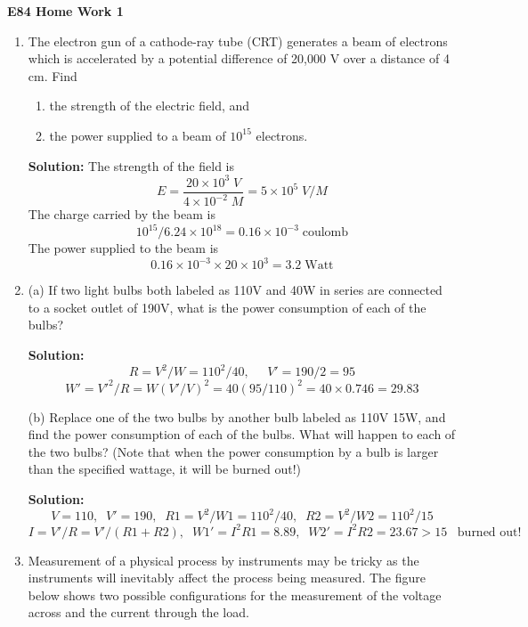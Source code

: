 \usepackage{html}

\begin{center}
{\Large \bf E84 Home Work 1}
\end{center}
\begin{enumerate}

\item The electron gun of a cathode-ray tube (CRT) generates a beam
  of electrons which is accelerated by a potential difference of
  20,000 V over a distance of 4 cm. Find 
\begin{enumerate}
\item the strength of the electric field, and
\item the power supplied to a beam of $10^{15}$ electrons.
\end{enumerate}

{\bf Solution:}  
The strength of the field is
\[ E=\frac{20\times 10^3\;V}{4 \times 10^{-2}\;M}=5\times 10^5\; V/M \]
The charge carried by the beam is
\[ 10^{15}/6.24\times 10^{18}=0.16\times 10^{-3}\;\mbox{coulomb} \]
The power supplied to the beam is
\[ 0.16\times 10^{-3} \times 20 \times 10^3 = 3.2 \;\mbox{Watt} \]

\item (a) If two light bulbs both labeled as 110V and 40W in series are
connected to a socket outlet of 190V, what is the power consumption of 
each of the bulbs?

{\bf Solution:}
\[ R=V^2/W=110^2/40,\;\;\;\;\; V'=190/2=95	\]
\[ W'=V'^2/R=W (V'/V)^2=40 (95/110)^2=40\times 0.746=29.83	\]

(b) Replace one of the two bulbs by another bulb labeled as 110V 15W, and
find the power consumption of each of the bulbs. What will happen to each
of the two bulbs? (Note that when the power consumption by a bulb is larger
than the specified wattage, it will be burned out!)

{\bf Solution:}
\[ V=110,\;\;V'=190,\;\;R1=V^2/W1=110^2/40,\;\;R2=V^2/W2=110^2/15	\]
\[ I=V'/R=V'/(R1+R2),\;\; W1'=I^2 R1=8.89,\;\;W2'=I^2 R2=23.67>15\;\;\;
	\mbox{burned out!}	\]

\item Measurement of a physical process by instruments may be tricky as
the instruments will inevitably affect the process being measured. The 
figure below shows two possible configurations for the measurement of the
voltage across and the current through the load. 



\end{enumerate}
